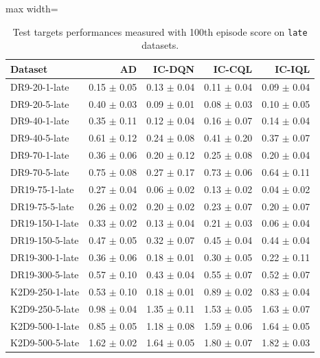 \documentclass{article}
\begin{document}
\begin{table}[ht]
    \label{tab:}
    \begin{center}
     \caption{Test targets performances measured with 100th episode score on \texttt{late} datasets.}
    \begin{small}
    \begin{adjustbox}{max width=\columnwidth}
		\begin{tabular}{l|rrrr}
		\toprule
	\textbf{Dataset} & \textbf{AD} & \textbf{IC-DQN} & \textbf{IC-CQL} & \textbf{IC-IQL}\\
\midrule
DR9-20-1-late & 0.15 $\pm$ 0.05 & 0.13 $\pm$ 0.04 & 0.11 $\pm$ 0.04 & 0.09 $\pm$ 0.04\\
DR9-20-5-late & 0.40 $\pm$ 0.03 & 0.09 $\pm$ 0.01 & 0.08 $\pm$ 0.03 & 0.10 $\pm$ 0.05\\
DR9-40-1-late & 0.35 $\pm$ 0.11 & 0.12 $\pm$ 0.04 & 0.16 $\pm$ 0.07 & 0.14 $\pm$ 0.04\\
DR9-40-5-late & 0.61 $\pm$ 0.12 & 0.24 $\pm$ 0.08 & 0.41 $\pm$ 0.20 & 0.37 $\pm$ 0.07\\
DR9-70-1-late & 0.36 $\pm$ 0.06 & 0.20 $\pm$ 0.12 & 0.25 $\pm$ 0.08 & 0.20 $\pm$ 0.04\\
DR9-70-5-late & 0.75 $\pm$ 0.08 & 0.27 $\pm$ 0.17 & 0.73 $\pm$ 0.06 & 0.64 $\pm$ 0.11\\
DR19-75-1-late & 0.27 $\pm$ 0.04 & 0.06 $\pm$ 0.02 & 0.13 $\pm$ 0.02 & 0.04 $\pm$ 0.02\\
DR19-75-5-late & 0.26 $\pm$ 0.02 & 0.20 $\pm$ 0.02 & 0.23 $\pm$ 0.07 & 0.20 $\pm$ 0.07\\
DR19-150-1-late & 0.33 $\pm$ 0.02 & 0.13 $\pm$ 0.04 & 0.21 $\pm$ 0.03 & 0.06 $\pm$ 0.04\\
DR19-150-5-late & 0.47 $\pm$ 0.05 & 0.32 $\pm$ 0.07 & 0.45 $\pm$ 0.04 & 0.44 $\pm$ 0.04\\
DR19-300-1-late & 0.36 $\pm$ 0.06 & 0.18 $\pm$ 0.01 & 0.30 $\pm$ 0.05 & 0.22 $\pm$ 0.11\\
DR19-300-5-late & 0.57 $\pm$ 0.10 & 0.43 $\pm$ 0.04 & 0.55 $\pm$ 0.07 & 0.52 $\pm$ 0.07\\
K2D9-250-1-late & 0.53 $\pm$ 0.10 & 0.18 $\pm$ 0.01 & 0.89 $\pm$ 0.02 & 0.83 $\pm$ 0.04\\
K2D9-250-5-late & 0.98 $\pm$ 0.04 & 1.35 $\pm$ 0.11 & 1.53 $\pm$ 0.05 & 1.63 $\pm$ 0.07\\
K2D9-500-1-late & 0.85 $\pm$ 0.05 & 1.18 $\pm$ 0.08 & 1.59 $\pm$ 0.06 & 1.64 $\pm$ 0.05\\
K2D9-500-5-late & 1.62 $\pm$ 0.02 & 1.64 $\pm$ 0.05 & 1.80 $\pm$ 0.07 & 1.82 $\pm$ 0.03\\

\end{tabular}
\end{adjustbox}
\end{small}
\end{center}
\end{table}
\end{document}
